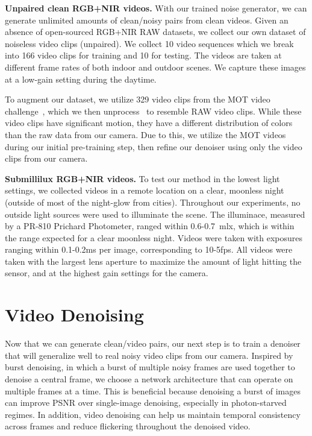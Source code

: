\documentclass[final]{cvpr}
\begin{document}
\vspace{1mm}\noindent\textbf{Unpaired clean RGB+NIR videos.}
With our trained noise generator, we can generate unlimited amounts of clean/noisy pairs from clean videos. Given an absence of open-sourced RGB+NIR RAW datasets, we collect our own dataset of noiseless video clips (unpaired). We collect 10 video sequences which we break into 166 video clips for training and 10 for testing. The videos are taken at different frame rates of both indoor and outdoor scenes. We capture these images at a low-gain setting during the daytime.

To augment our dataset, we utilize 329 video clips from the MOT video challenge~\cite{leal2015motchallenge}, which we then unprocess~\cite{brooks2019unprocessing} to resemble RAW video clips. While these video clips have significant motion, they have a different distribution of colors than the raw data from our camera. Due to this, we utilize the MOT videos during our initial pre-training step, then refine our denoiser using only the video clips from our camera. 

\vspace{1mm}\noindent\textbf{Submillilux RGB+NIR videos.}
To test our method in the lowest light settings, we collected videos in a remote location on a clear, moonless night (outside of most of the night-glow from cities). Throughout our experiments, no outside light sources were used to illuminate the scene. The illuminace, measured by a PR-810 Prichard Photometer, ranged within 0.6-0.7~\si{\milli\lux}, which is within the range expected for a clear moonless night. Videos were taken with exposures ranging within 0.1-0.2\si{\milli\second} per image, corresponding to 10-5fps. All videos were taken with the largest lens aperture to maximize the amount of light hitting the sensor, and at the highest gain settings for the camera.



\section{Video Denoising}
\label{sec:denoiser}
Now that we can generate clean/video pairs, our next step is to train a denoiser that will generalize well to real noisy video clips from our camera. Inspired by burst denoising, in which a burst of multiple noisy frames are used together to denoise a central frame, we choose a network architecture that can operate on multiple frames at a time. This is beneficial because denoising a burst of images can improve PSNR over single-image denoising, especially in photon-starved regimes.  In addition, video denoising can help us maintain temporal consistency across frames and reduce flickering throughout the denoised video. 
\end{document}
